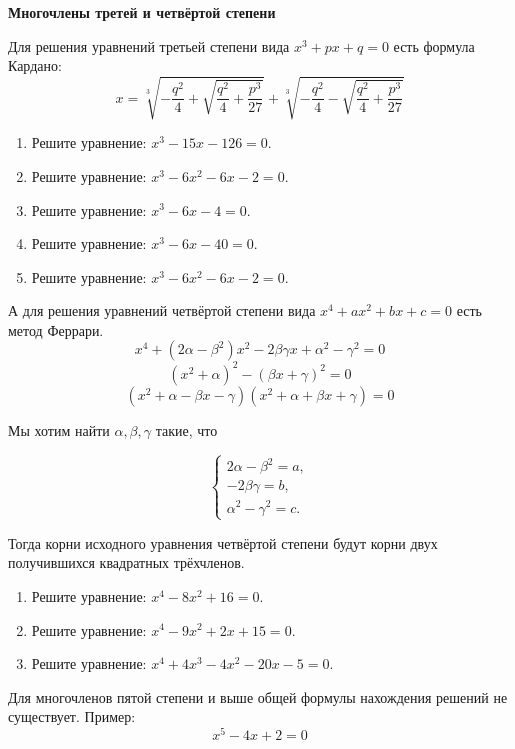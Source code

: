 \documentclass{article}
\begin{document}
\large
	

\begin{center}
\textbf{Многочлены третей и четвёртой степени}
\end{center}

Для решения уравнений третьей степени вида $x^3 + px + q = 0$ есть формула Кардано:
$$\boxed{x=\sqrt[3]{-\frac{q^2}{4} + \sqrt{\frac{q^2}{4} +\frac{p^3}{27}}} + \sqrt[3]{-\frac{q^2}{4} - \sqrt{\frac{q^2}{4} +\frac{p^3}{27}}}}$$


\begin{enumerate}[label*=\protect\fbox{\arabic{enumi}}]

\item Решите уравнение: $x^3 - 15 x - 126 = 0.$

\item Решите уравнение: $x^3 - 6x^2 - 6x - 2 = 0.$

\item Решите уравнение: $x^3 - 6x - 4 = 0.$

\item Решите уравнение: $x^3 - 6x - 40 = 0.$

\item Решите уравнение: $x^3 - 6x^2 - 6x - 2 = 0.$


\end{enumerate}

А для решения уравнений четвёртой степени вида $x^4 + ax^2+ bx + c = 0$ есть метод Феррари.
$$x^4 + (2\alpha - \beta^2)  x^2  -2\beta\gamma x + \alpha^2- \gamma^2 = 0$$
$$(x^2 + \alpha)^2 - (\beta x + \gamma)^2 = 0$$
$$(x^2 + \alpha - \beta x - \gamma)(x^2 + \alpha + \beta x + \gamma) = 0$$

Мы хотим найти $\alpha, \beta, \gamma$ такие, что

\begin{equation*}
	\begin{cases}
		2\alpha - \beta^2 = a,
		\\
		-2\beta\gamma = b,
		\\
		\alpha^2- \gamma^2 = c.
	\end{cases}
\end{equation*}

Тогда корни исходного уравнения четвёртой степени будут корни двух получившихся квадратных трёхчленов.

\begin{enumerate}[label*=\protect\fbox{\arabic{enumi}}]

\item Решите уравнение: $x^4 - 8x^2 + 16 = 0.$

\item Решите уравнение: $x^4 - 9x^2 + 2x + 15 = 0.$

\item Решите уравнение: $x^4 + 4x^3 - 4x^2 - 20x - 5 = 0.$

\end{enumerate}

Для многочленов пятой степени и выше общей формулы нахождения решений не существует. Пример:
$$x^5 - 4x + 2 = 0$$
\end{document}
